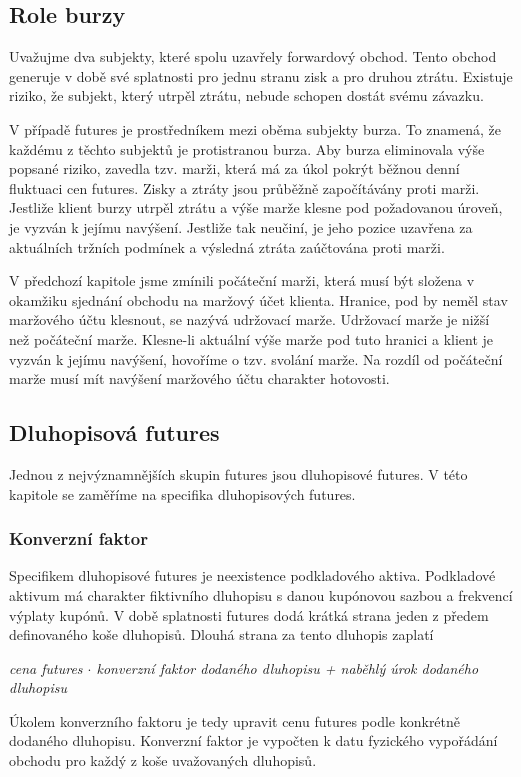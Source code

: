 \documentclass[a4paper]{book}
\begin{document}
\subsection{Role burzy}

Uvažujme dva subjekty, které spolu uzavřely forwardový obchod. Tento obchod generuje v době své splatnosti pro jednu stranu zisk a pro druhou ztrátu. Existuje riziko, že subjekt, který utrpěl ztrátu, nebude schopen dostát svému závazku.

V případě futures je prostředníkem mezi oběma subjekty burza. To znamená, že každému z těchto subjektů je protistranou burza. Aby burza eliminovala výše popsané riziko, zavedla tzv. marži, která má za úkol pokrýt běžnou denní fluktuaci cen futures. Zisky a ztráty jsou průběžně započítávány proti marži. Jestliže klient burzy utrpěl ztrátu a výše marže klesne pod požadovanou úroveň, je vyzván k jejímu navýšení. Jestliže tak neučiní, je jeho pozice uzavřena za aktuálních tržních podmínek a výsledná ztráta zaúčtována proti marži.

V předchozí kapitole jsme zmínili počáteční marži, která musí být složena v okamžiku sjednání obchodu na maržový účet klienta. Hranice, pod by neměl stav maržového účtu klesnout, se nazývá udržovací marže. Udržovací marže je nižší než počáteční marže. Klesne-li aktuální výše marže pod tuto hranici a klient je vyzván k jejímu navýšení, hovoříme o tzv. svolání marže. Na rozdíl od počáteční marže musí mít navýšení maržového účtu charakter hotovosti.

\subsection{Dluhopisová futures}

Jednou z nejvýznamnějších skupin futures jsou dluhopisové futures. V této kapitole se zaměříme na specifika dluhopisových futures.

\subsubsection{Konverzní faktor}

Specifikem dluhopisové futures je neexistence podkladového aktiva. Podkladové aktivum má charakter fiktivního dluhopisu s danou kupónovou sazbou a frekvencí výplaty kupónů. V době splatnosti futures dodá krátká strana jeden z předem definovaného koše dluhopisů. Dlouhá strana za tento dluhopis zaplatí
\begin{center}
\textit{cena futures $\cdot$ konverzní faktor dodaného dluhopisu + naběhlý úrok dodaného dluhopisu}
\end{center}
Úkolem konverzního faktoru je tedy upravit cenu futures podle konkrétně dodaného dluhopisu. Konverzní faktor je vypočten k datu fyzického vypořádání obchodu pro každý z koše uvažovaných dluhopisů.\\
\end{document}
